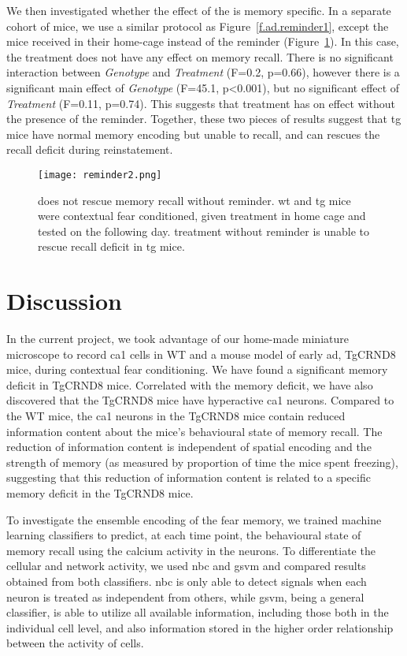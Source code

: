 We then investigated whether the effect of the \tglu{} is memory specific. In a separate cohort of mice, we use a similar protocol as Figure~\ref{f.ad.reminder1}, except the mice received \tglu{} in their home-cage instead of the reminder (Figure~\ref{f.ad.reminder2}). In this case, the \tglu{} treatment does not have any effect on memory recall. There is no significant interaction between \textit{Genotype} and \textit{Treatment} (F=0.2, p=0.66), however there is a significant main effect of \textit{Genotype} (F=45.1, p<0.001), but no significant effect of \textit{Treatment} (F=0.11, p=0.74). This suggests that \tglu{} treatment has on effect without the presence of the reminder. Together, these two pieces of results suggest that \gls{tg} mice have normal memory encoding but unable to recall, and \tglu{} can rescues the recall deficit during reinstatement. 


\begin{figure}[h]
    \texttt{[image: reminder2.png]}
    \caption[\tglu{} treatment does not rescue memory recall without reminder.]{\tglu{} does not rescue memory recall without reminder. \gls{wt} and \gls{tg} mice were contextual fear conditioned, given treatment in home cage and tested on the following day. \tglu{} treatment without reminder is unable to rescue recall deficit in \gls{tg} mice. \label{f.ad.reminder2}}
\end{figure}

\section{Discussion}


In the current project, we took advantage of our home-made miniature microscope to record \gls{ca1} cells in WT and a mouse model of early \gls{ad}, TgCRND8 mice, during contextual fear conditioning. We have found a significant memory deficit in TgCRND8 mice. Correlated with the memory deficit, we have also discovered that the TgCRND8 mice have hyperactive \gls{ca1} neurons. Compared to the WT mice, the \gls{ca1} neurons in the TgCRND8 mice contain reduced information content about the mice's behavioural state of memory recall. The reduction of information content is independent of spatial encoding and the strength of memory (as measured by proportion of time the mice spent freezing), suggesting that this reduction of information content is related to a specific memory deficit in the TgCRND8 mice.

To investigate the ensemble encoding of the fear memory, we trained machine learning classifiers to predict, at each time point, the behavioural state of memory recall using the calcium activity in the neurons. To differentiate the cellular and network activity, we used \gls{nbc} and \gls{gsvm} and compared results obtained from both classifiers. \Gls{nbc} is only able to detect signals when each neuron is treated as independent from others, while \gls{gsvm}, being a general classifier, is able to utilize all available information, including those both in the individual cell level, and also information stored in the higher order relationship between the activity of cells. 

